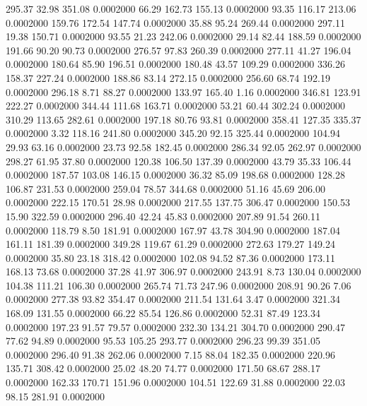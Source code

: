  295.37   32.98  351.08   0.0002000
  66.29  162.73  155.13   0.0002000
  93.35  116.17  213.06   0.0002000
 159.76  172.54  147.74   0.0002000
  35.88   95.24  269.44   0.0002000
 297.11   19.38  150.71   0.0002000
  93.55   21.23  242.06   0.0002000
  29.14   82.44  188.59   0.0002000
 191.66   90.20   90.73   0.0002000
 276.57   97.83  260.39   0.0002000
 277.11   41.27  196.04   0.0002000
 180.64   85.90  196.51   0.0002000
 180.48   43.57  109.29   0.0002000
 336.26  158.37  227.24   0.0002000
 188.86   83.14  272.15   0.0002000
 256.60   68.74  192.19   0.0002000
 296.18    8.71   88.27   0.0002000
 133.97  165.40    1.16   0.0002000
 346.81  123.91  222.27   0.0002000
 344.44  111.68  163.71   0.0002000
  53.21   60.44  302.24   0.0002000
 310.29  113.65  282.61   0.0002000
 197.18   80.76   93.81   0.0002000
 358.41  127.35  335.37   0.0002000
   3.32  118.16  241.80   0.0002000
 345.20   92.15  325.44   0.0002000
 104.94   29.93   63.16   0.0002000
  23.73   92.58  182.45   0.0002000
 286.34   92.05  262.97   0.0002000
 298.27   61.95   37.80   0.0002000
 120.38  106.50  137.39   0.0002000
  43.79   35.33  106.44   0.0002000
 187.57  103.08  146.15   0.0002000
  36.32   85.09  198.68   0.0002000
 128.28  106.87  231.53   0.0002000
 259.04   78.57  344.68   0.0002000
  51.16   45.69  206.00   0.0002000
 222.15  170.51   28.98   0.0002000
 217.55  137.75  306.47   0.0002000
 150.53   15.90  322.59   0.0002000
 296.40   42.24   45.83   0.0002000
 207.89   91.54  260.11   0.0002000
 118.79    8.50  181.91   0.0002000
 167.97   43.78  304.90   0.0002000
 187.04  161.11  181.39   0.0002000
 349.28  119.67   61.29   0.0002000
 272.63  179.27  149.24   0.0002000
  35.80   23.18  318.42   0.0002000
 102.08   94.52   87.36   0.0002000
 173.11  168.13   73.68   0.0002000
  37.28   41.97  306.97   0.0002000
 243.91    8.73  130.04   0.0002000
 104.38  111.21  106.30   0.0002000
 265.74   71.73  247.96   0.0002000
 208.91   90.26    7.06   0.0002000
 277.38   93.82  354.47   0.0002000
 211.54  131.64    3.47   0.0002000
 321.34  168.09  131.55   0.0002000
  66.22   85.54  126.86   0.0002000
  52.31   87.49  123.34   0.0002000
 197.23   91.57   79.57   0.0002000
 232.30  134.21  304.70   0.0002000
 290.47   77.62   94.89   0.0002000
  95.53  105.25  293.77   0.0002000
 296.23   99.39  351.05   0.0002000
 296.40   91.38  262.06   0.0002000
   7.15   88.04  182.35   0.0002000
 220.96  135.71  308.42   0.0002000
  25.02   48.20   74.77   0.0002000
 171.50   68.67  288.17   0.0002000
 162.33  170.71  151.96   0.0002000
 104.51  122.69   31.88   0.0002000
  22.03   98.15  281.91   0.0002000
